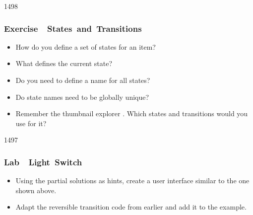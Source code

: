 \begin{slide}{1498}\frametitle{Exercise~\textendash~States~and~Transitions}

\begin{itemize}
\item How do you define a set of states for an item?
\item What defines the current state?
\item Do you need to define a name for all states?
\item Do state names need to be globally unique?
\item Remember the thumbnail explorer . Which states and transitions would you use for it?
\end{itemize}

\end{slide}

\begin{slide}{1497}\frametitle{Lab~\textendash~Light~Switch}

\vspace*{-1em}
\begin{center}
\hspace*{0.5em}
\end{center}

\vspace*{-0.5em}
\begin{itemize}
\item Using the partial solutions as hints, create a user interface similar
to the one shown above.
\end{itemize}

\begin{center}
\hspace*{0.5em}
\hspace*{0.5em}
\end{center}

\vspace*{-0.5em}
\begin{itemize}
\item Adapt the reversible transition code from earlier and add it to the
example. 

\end{itemize}

\end{slide}

                                                                   
